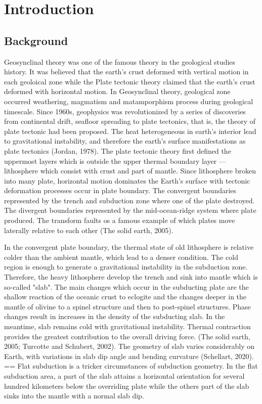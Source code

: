 
\chapter{Introduction}

\section{Background}

Geosynclinal theory was one of the famous theory in the geological studies history. 
It was believed that the earth's crust deformed with vertical motion in each geoloical zone while the Plate tectonic theory claimed that the earth's crust deformed with horizontal motion. 
In Geosynclinal theory, geological zone occurred weathering, magmatism and matamporphism process during geological timescale. 
Since 1960s, geophysics was revolutionized by a series of discoveries from continental drift, seafloor spreading to plate tectonics, that is, the theory of plate tectonic had been proposed. 
The heat heterogeneous in earth's interior lead to gravitational instability, and therefore the earth's surface manifestations as plate tectonics (Jordan, 1978). 
The plate tectonic theory first defined the uppermost layers which is outside the upper thermal boundary layer --- lithosphere which consist with crust and part of mantle. 
Since lithosphere broken into many plate, horizontal motion dominates the Earth's surface with tectonic deformation processes  occur in plate boundary. 
The convergent boundaries represented by the trench and subduction zone where one of the plate destroyed. 
The divergent boundaries represented by the mid-ocean-ridge system where plate produced. 
The transform faults os a famous example of which plates move laterally relative to each other (The solid earth, 2005). 



In the convergent plate boundary, the thermal state of old lithosphere is relative colder than the ambient mantle, which lead to a denser condition. The cold region is enough to generate a gravitational instability in the subduction zone. Therefore, the heavy lithosphere develop the trench and sink into mantle which is so-called "slab".  The main changes which occur in the subducting plate are the shallow reaction of the oceanic crust to eclogite and the changes deeper in the mantle of olivine to a spinel structure and then to post-spinel structures. Phase changes result in increases in the density of the subducting slab. In the meantime, slab remains cold with gravitational instability. Thermal contraction provides the greatest contribution to the overall driving force. (The solid earth, 2005; Turcotte and Schubert, 2002). The geometry of slab varies considerably on Earth, with variations in slab dip angle and bending curvature (Schellart, 2020).
==
Flat subduction is a tricker circumstances of subduction geometry. In the flat subduction area, a part of the slab attains a horizontal orientation for several hundred kilometers below the overriding plate while the others part of the slab sinks into the mantle with a normal slab dip.



